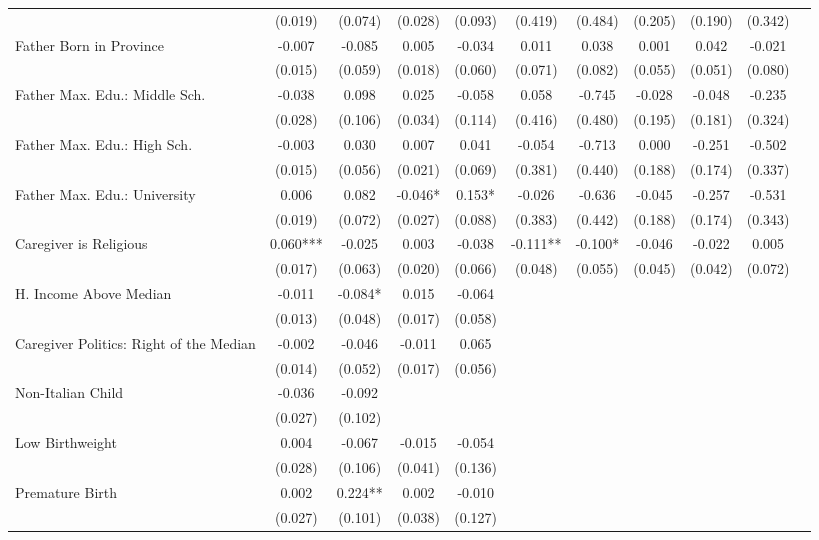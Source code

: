 \begin{tabular}{lcccccccccc}
 & (0.019) & (0.074) & (0.028) & (0.093) & (0.419) & (0.484) & (0.205) & (0.190) & (0.342) &  \\
Father Born in Province & -0.007 & -0.085 & 0.005 & -0.034 & 0.011 & 0.038 & 0.001 & 0.042 & -0.021 &  \\
 & (0.015) & (0.059) & (0.018) & (0.060) & (0.071) & (0.082) & (0.055) & (0.051) & (0.080) &  \\
Father Max. Edu.: Middle Sch. & -0.038 & 0.098 & 0.025 & -0.058 & 0.058 & -0.745 & -0.028 & -0.048 & -0.235 &  \\
 & (0.028) & (0.106) & (0.034) & (0.114) & (0.416) & (0.480) & (0.195) & (0.181) & (0.324) & \\
Father Max. Edu.: High Sch. & -0.003 & 0.030 & 0.007 & 0.041 & -0.054 & -0.713 & 0.000 & -0.251 & -0.502 &  \\
 & (0.015) & (0.056) & (0.021) & (0.069) & (0.381) & (0.440) & (0.188) & (0.174) & (0.337) &  \\
Father Max. Edu.: University & 0.006 & 0.082 & -0.046* & 0.153* & -0.026 & -0.636 & -0.045 & -0.257 & -0.531 &  \\
 & (0.019) & (0.072) & (0.027) & (0.088) & (0.383) & (0.442) & (0.188) & (0.174) & (0.343) &  \\
Caregiver is Religious & 0.060*** & -0.025 & 0.003 & -0.038 & -0.111** & -0.100* & -0.046 & -0.022 & 0.005 & \\
 & (0.017) & (0.063) & (0.020) & (0.066) & (0.048) & (0.055) & (0.045) & (0.042) & (0.072) &  \\
H. Income Above Median & -0.011 & -0.084* & 0.015 & -0.064 &  &  &  &  &  &  \\
 & (0.013) & (0.048) & (0.017) & (0.058) &  &  &  &  &  &  \\
Caregiver Politics: Right of the Median & -0.002 & -0.046 & -0.011 & 0.065 &  &  &  &  &  &  \\
 & (0.014) & (0.052) & (0.017) & (0.056) &  &  &  &  &  &  \\
Non-Italian Child & -0.036 & -0.092 &  &  &  &  &  &  &  &  \\
 & (0.027) & (0.102) &  &  &  &  &  &  &  &  \\
Low Birthweight & 0.004 & -0.067 & -0.015 & -0.054 &  &  &  &  &  &  \\
 & (0.028) & (0.106) & (0.041) & (0.136) &  &  &  &  &  &  \\
Premature Birth & 0.002 & 0.224** & 0.002 & -0.010 &  &  &  &  &  &  \\
 & (0.027) & (0.101) & (0.038) & (0.127) &  &  &  &  &  &  \\

\end{tabular}
